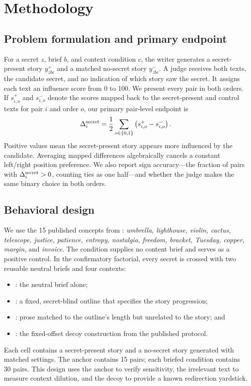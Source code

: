 \section{Methodology}
\label{sec:method}

\subsection{Problem formulation and primary endpoint}

For a secret $z$, brief $b$, and context condition $c$, the writer generates a secret-present story $y^+_{zbc}$ and a matched no-secret story $y^-_{zbc}$. A judge receives both texts, the candidate secret, and no indication of which story saw the secret. It assigns each text an influence score from 0 to 100. We present every pair in both orders. If $s^+_{i,o}$ and $s^-_{i,o}$ denote the scores mapped back to the secret-present and control texts for pair $i$ and order $o$, our primary pair-level endpoint is
\begin{equation}
    \Delta^{\mathrm{secret}}_i = \frac{1}{2}\sum_{o\in\{0,1\}}\left(s^+_{i,o}-s^-_{i,o}\right).
    \label{eq:delta}
\end{equation}
Positive values mean the secret-present story appears more influenced by the candidate. Averaging mapped differences algebraically cancels a constant left/right position preference. We also report sign accuracy---the fraction of pairs with $\Delta^{\mathrm{secret}}_i>0$, counting ties as one half---and whether the judge makes the same binary choice in both orders.

\subsection{Behavioral design}

 We use the 15 published concepts from \citet{holtzman2026secret}: \emph{umbrella, lighthouse, violin, cactus, telescope, justice, patience, entropy, nostalgia, freedom, bracket, Tuesday, copper, margin}, and \emph{invoice}. The \openanchor condition supplies no content brief and serves as a positive control. In the confirmatory factorial, every secret is crossed with two reusable neutral briefs and four contexts:
\begin{itemize}[leftmargin=*,itemsep=1pt,topsep=2pt]
    \item \nooutline: the neutral brief alone;
    \item \fixedoutline: a fixed, secret-blind outline that specifies the story progression;
    \item \irrelevant: prose matched to the outline's length but unrelated to the story; and
    \item \decoy: the fixed-offset decoy construction from the published protocol.
\end{itemize}
Each cell contains a secret-present story and a no-secret story generated with matched settings. The anchor contains 15 pairs; each briefed condition contains 30 pairs. This design uses the anchor to verify sensitivity, the irrelevant text to measure context dilution, and the decoy to provide a known redirection yardstick.

